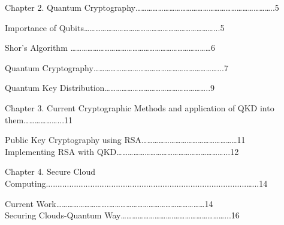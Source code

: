 \documentclass[12pt]{article}
\begin{document}
{\raggedright
Chapter 2. Quantum
Cryptography\ldots{}\ldots{}\ldots{}\ldots{}\ldots{}\ldots{}\ldots{}\ldots{}\ldots{}\ldots{}\ldots{}\ldots{}\ldots{}\ldots{}\ldots{}\ldots{}\ldots{}\ldots{}\ldots{}\ldots{}\ldots{}\ldots{}\ldots{}\ldots{}..5
}

{\raggedright
Importance of
Qubits\ldots{}\ldots{}\ldots{}\ldots{}\ldots{}\ldots{}\ldots{}\ldots{}\ldots{}\ldots{}\ldots{}\ldots{}\ldots{}\ldots{}\ldots{}\ldots{}\ldots{}\ldots{}\ldots{}\ldots{}\ldots{}\ldots{}\ldots{}...5
}

{\raggedright
Shor's Algorithm
\ldots{}\ldots{}\ldots{}\ldots{}\ldots{}\ldots{}\ldots{}\ldots{}\ldots{}\ldots{}\ldots{}\ldots{}\ldots{}\ldots{}\ldots{}\ldots{}\ldots{}\ldots{}\ldots{}\ldots{}\ldots{}\ldots{}\ldots{}\ldots{}\ldots{}6
}

{\raggedright
Quantum
Cryptography\ldots{}\ldots{}\ldots{}\ldots{}\ldots{}\ldots{}\ldots{}\ldots{}\ldots{}\ldots{}\ldots{}\ldots{}\ldots{}\ldots{}\ldots{}\ldots{}\ldots{}\ldots{}\ldots{}\ldots{}\ldots{}\ldots{}...7
}

{\raggedright
Quantum Key
Distribution\ldots{}\ldots{}\ldots{}\ldots{}\ldots{}\ldots{}\ldots{}\ldots{}\ldots{}\ldots{}\ldots{}\ldots{}\ldots{}\ldots{}\ldots{}\ldots{}\ldots{}\ldots{}..9
\\

}

{\raggedright
Chapter 3. Current Cryptographic Methods and application of QKD into
them\ldots{}\ldots{}\ldots{}\ldots{}\ldots{}\ldots{}...11
}

{\raggedright
Public Key Cryptography using
RSA\ldots{}\ldots{}\ldots{}\ldots{}\ldots{}\ldots{}\ldots{}\ldots{}\ldots{}\ldots{}\ldots{}\ldots{}\ldots{}\ldots{}\ldots{}\ldots{}\ldots{}11
\\
Implementing RSA with
QKD\ldots{}\ldots{}\ldots{}\ldots{}\ldots{}\ldots{}\ldots{}\ldots{}\ldots{}\ldots{}\ldots{}\ldots{}\ldots{}\ldots{}\ldots{}\ldots{}\ldots{}\ldots{}\ldots{}...12
\\

}

{\raggedright
Chapter 4. Secure Cloud
Computing......................................................................................\ldots{}...14
}

{\raggedright
Current
Work\ldots{}\ldots{}\ldots{}\ldots{}\ldots{}\ldots{}\ldots{}\ldots{}\ldots{}.\ldots{}\ldots{}\ldots{}\ldots{}\ldots{}\ldots{}\ldots{}\ldots{}\ldots{}\ldots{}\ldots{}\ldots{}\ldots{}\ldots{}\ldots{}\ldots{}\ldots{}14
\\
Securing Clouds-Quantum
Way\ldots{}\ldots{}\ldots{}\ldots{}\ldots{}\ldots{}\ldots{}\ldots{}\ldots{}.\ldots{}\ldots{}\ldots{}\ldots{}\ldots{}\ldots{}\ldots{}\ldots{}\ldots{}...16
\\

}
\end{document}
